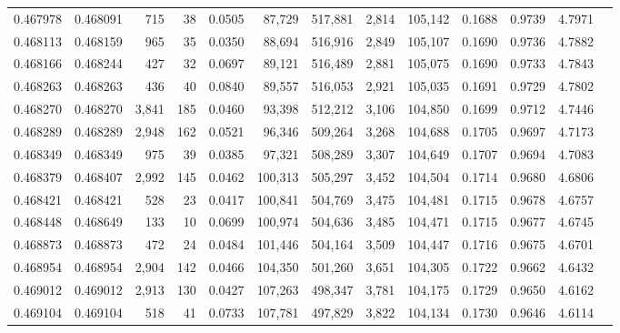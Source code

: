 \begin{tabular}{rrrrrrrrrrrrr}
0.467978 & 0.468091 &   715 &    38 &                                     0.0505 &  87,729 & 517,881 &   2,814 & 105,142 & 0.1688 & 0.9739 & 4.7971 \\
0.468113 & 0.468159 &   965 &    35 &                                     0.0350 &  88,694 & 516,916 &   2,849 & 105,107 & 0.1690 & 0.9736 & 4.7882 \\
0.468166 & 0.468244 &   427 &    32 &                                     0.0697 &  89,121 & 516,489 &   2,881 & 105,075 & 0.1690 & 0.9733 & 4.7843 \\
0.468263 & 0.468263 &   436 &    40 &                                     0.0840 &  89,557 & 516,053 &   2,921 & 105,035 & 0.1691 & 0.9729 & 4.7802 \\
0.468270 & 0.468270 & 3,841 &   185 &                                     0.0460 &  93,398 & 512,212 &   3,106 & 104,850 & 0.1699 & 0.9712 & 4.7446 \\
0.468289 & 0.468289 & 2,948 &   162 &                                     0.0521 &  96,346 & 509,264 &   3,268 & 104,688 & 0.1705 & 0.9697 & 4.7173 \\
0.468349 & 0.468349 &   975 &    39 &                                     0.0385 &  97,321 & 508,289 &   3,307 & 104,649 & 0.1707 & 0.9694 & 4.7083 \\
0.468379 & 0.468407 & 2,992 &   145 &                                     0.0462 & 100,313 & 505,297 &   3,452 & 104,504 & 0.1714 & 0.9680 & 4.6806 \\
0.468421 & 0.468421 &   528 &    23 &                                     0.0417 & 100,841 & 504,769 &   3,475 & 104,481 & 0.1715 & 0.9678 & 4.6757 \\
0.468448 & 0.468649 &   133 &    10 &                                     0.0699 & 100,974 & 504,636 &   3,485 & 104,471 & 0.1715 & 0.9677 & 4.6745 \\
0.468873 & 0.468873 &   472 &    24 &                                     0.0484 & 101,446 & 504,164 &   3,509 & 104,447 & 0.1716 & 0.9675 & 4.6701 \\
0.468954 & 0.468954 & 2,904 &   142 &                                     0.0466 & 104,350 & 501,260 &   3,651 & 104,305 & 0.1722 & 0.9662 & 4.6432 \\
0.469012 & 0.469012 & 2,913 &   130 &                                     0.0427 & 107,263 & 498,347 &   3,781 & 104,175 & 0.1729 & 0.9650 & 4.6162 \\
0.469104 & 0.469104 &   518 &    41 &                                     0.0733 & 107,781 & 497,829 &   3,822 & 104,134 & 0.1730 & 0.9646 & 4.6114 \\

\end{tabular}
